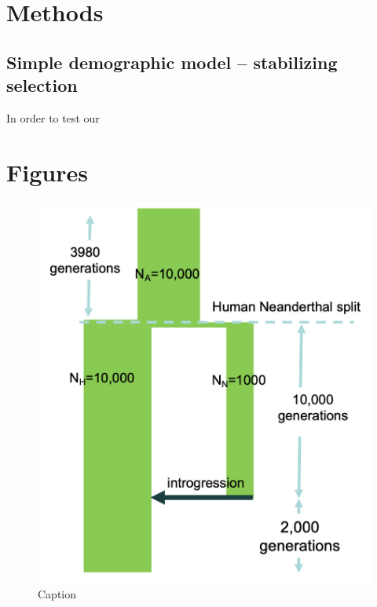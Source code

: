 \section{Methods}
\subsection{Simple demographic model – stabilizing selection}
In order to test our 
\newpage
\section{Figures}
\begin{figure}[htb]
    \centering
    \includegraphics[width=\textwidth]{chapter5/figures/fig5.1.png}
    \caption{Caption}
    \label{fig:5.1}
\end{figure}

